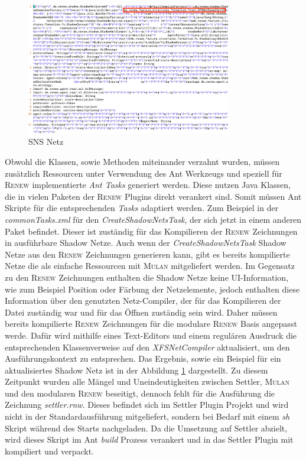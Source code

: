 	\begin{figure}[h!]
	  \centering
	  \includegraphics[width=0.8\textwidth]{material/images/shadownet.png}
	  \caption{SNS Netz}
	  \label{fig:sns_netz}
	\end{figure}

	Obwohl die Klassen, sowie Methoden miteinander verzahnt wurden, müssen zusätzlich Ressourcen unter Verwendung des Ant Werkzeugs und speziell für \textsc{Renew} implementierte \textit{Ant Tasks} generiert werden. Diese nutzen Java Klassen, die in vielen Paketen der \textsc{Renew} Plugins direkt verankert sind. Somit müssen Ant Skripte für die entsprechenden \textit{Tasks} adaptiert werden. Zum Beispiel in der \textit{commonTasks.xml} für den \textit{CreateShadowNetsTask}, der sich jetzt in einem anderen Paket befindet. Dieser ist zuständig für das Kompilieren der \textsc{Renew} Zeichnungen in ausführbare Shadow Netze. Auch wenn der \textit{CreateShadowNetsTask} Shadow Netze aus den \textsc{Renew} Zeichnungen generieren kann, gibt es bereits kompilierte Netze die als einfache Ressourcen mit \textsc{Mulan} mitgeliefert werden. \newline
	Im Gegensatz zu den \textsc{Renew} Zeichnungen enthalten die Shadow Netze keine UI-Information, wie zum Beispiel Position oder Färbung der Netzelemente, jedoch enthalten diese Information über den genutzten Netz-Compiler, der für das Kompilieren der Datei zuständig war und für das Öffnen zuständig sein wird. Daher müssen bereits kompilierte \textsc{Renew} Zeichnungen für die modulare \textsc{Renew} Basis angepasst werde. Dafür wird mithilfe eines Text-Editors und einem regulären Ausdruck die entsprechenden Klassenverweise auf den \textit{XFSNetCompiler} aktualisiert, um den Ausführungskontext zu entsprechen. \newline
	Das Ergebnis, sowie ein Beispiel für ein aktualisiertes Shadow Netz ist in der Abbildung \ref{fig:sns_netz} dargestellt. \bigbreak
	Zu diesem Zeitpunkt wurden alle Mängel und Uneindeutigkeiten zwischen Settler, \textsc{Mulan} und den modularen \textsc{Renew} beseitigt, dennoch fehlt für die Ausführung die Zeichnung \textit{settler.rnw}. Dieses befindet sich im Settler Plugin Projekt und wird nicht in der Standardausführung mitgeliefert, sondern bei Bedarf mit einem \textit{sh} Skript während des Starts nachgeladen. \newline
	Da die Umsetzung auf Settler abzielt, wird dieses Skript im Ant \textit{build} Prozess verankert und in das Settler Plugin mit kompiliert und verpackt. \newline

